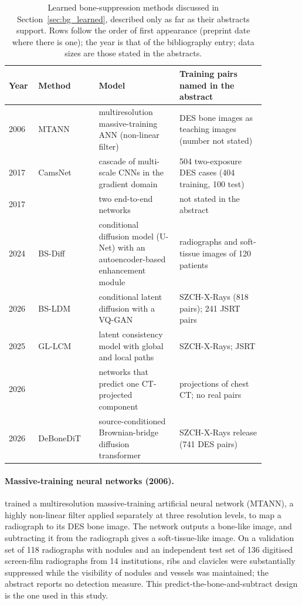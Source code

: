 \begin{table}[htbp]
\centering\small
\renewcommand{\arraystretch}{1.15}
\caption{Learned bone-suppression methods discussed in Section~\ref{sec:bg_learned}, described only as far as their abstracts support. Rows
follow the order of first appearance (preprint date where there is one); the year is that of the bibliography entry; data sizes are those stated
in the abstracts.}
\label{tab:bg_learned}
\begin{tabular}{@{}p{0.07\linewidth}p{0.21\linewidth}p{0.29\linewidth}p{0.30\linewidth}@{}}
\toprule
Year & Method & Model & Training pairs named in the abstract \\
\midrule
2006 & MTANN \citep{suzuki2006mtann} & multiresolution massive-training ANN (non-linear filter) & DES bone images as teaching images (number not stated) \\
2017 & CamsNet \citep{yang2017cascade} & cascade of multi-scale CNNs in the gradient domain & 504 two-exposure DES cases (404 training, 100 test) \\
2017 & \citet{gusarev2017deep} & two end-to-end networks & not stated in the abstract \\
2024 & BS-Diff \citep{chen2024bsdiff} & conditional diffusion model (U-Net) with an autoencoder-based enhancement module & radiographs and soft-tissue images of 120 patients \\
2026 & BS-LDM \citep{sun2026bsldm} & conditional latent diffusion with a VQ-GAN & SZCH-X-Rays (818 pairs); 241 JSRT pairs \\
2025 & GL-LCM \citep{sun2025gllcm} & latent consistency model with global and local paths & SZCH-X-Rays; JSRT \\
2026 & \citet{angaitkar2026anatomy} & networks that predict one CT-projected component & projections of chest CT; no real pairs \\
2026 & DeBoneDiT \citep{sun2026debonedit} & source-conditioned Brownian-bridge diffusion transformer & SZCH-X-Rays release (741 DES pairs) \\
\bottomrule
\end{tabular}
\end{table}

\paragraph{Massive-training neural networks (2006).} \citet{suzuki2006mtann} trained a multiresolution massive-training artificial neural
network (MTANN), a highly non-linear filter applied separately at three resolution levels, to map a radiograph to its DES bone image. The
network outputs a bone-like image, and subtracting it from the radiograph gives a soft-tissue-like image. On a validation set of 118 radiographs
with nodules and an independent test set of 136 digitised screen-film radiographs from 14 institutions, ribs and clavicles were substantially
suppressed while the visibility of nodules and vessels was maintained; the abstract reports no detection measure. This
predict-the-bone-and-subtract design is the one used in this study.

